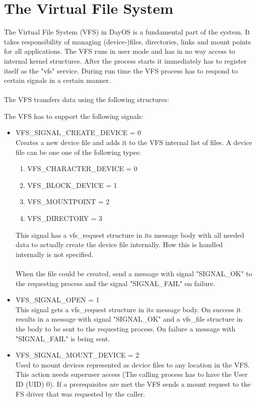 \section{The Virtual File System}
The Virtual File System (VFS) in DayOS is a fundamental part of the system.
It takes responsibility of managing (device-)files, directories, links and mount points
for all applications. The VFS runs in user mode and has in no way access to internal
kernel structures. After the process starts it immediately has to register itself as
the "vfs" service. During run time the VFS process has to respond to certain signals
in a certain manner. \\ \\
The VFS transfers data using the following structures:



The VFS has to support the following signals: \\
\begin{itemize}
\label{create_device}
\item VFS\_SIGNAL\_CREATE\_DEVICE = 0\\
  Creates a new device file and adds it to the VFS internal list of files.
  A device file can be one one of the following types:

  \begin{enumerate}
    \item VFS\_CHARACTER\_DEVICE = 0
	\item VFS\_BLOCK\_DEVICE = 1
	\item VFS\_MOUNTPOINT = 2
	\item VFS\_DIRECTORY = 3
  \end{enumerate}

  This signal has a vfs\_request structure in its message body with all needed data to actually
  create the device file internally. How this is handled internally is not specified. \\ \\
  When the file could be created, send a message with signal "SIGNAL\_OK" to the requesting process and
  the signal "SIGNAL\_FAIL" on failure.

\item VFS\_SIGNAL\_OPEN = 1 \\
  This signal gets a vfs\_request structure in its message body.
  On success it results in a message with signal "SIGNAL\_OK" and a vfs\_file structure in the body to be sent
  to the requesting process. On failure a message with "SIGNAL\_FAIL" is being sent.

\item VFS\_SIGNAL\_MOUNT\_DEVICE = 2 \\
  Used to mount devices represented as device files to any location in the VFS. This action needs
  superuser access (The calling process has to have the User ID (UID) 0).
  If a prerequisites are met the VFS sends a mount request to the FS driver that was requested by
  the caller. %

\end{itemize}

